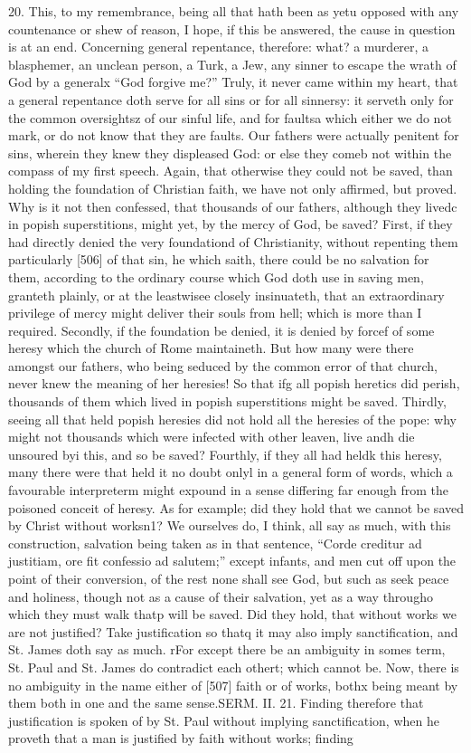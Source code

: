20. This, to my remembrance, being all that hath been as yetu opposed with any countenance or shew of reason, I hope, if this be answered, the cause in question is at an end. Concerning general repentance, therefore: what? a murderer, a blasphemer, an unclean person, a Turk, a Jew, any sinner to escape the wrath of God by a generalx “God forgive me?” Truly, it never came within my heart, that a general repentance doth serve for all sins or for all sinnersy: it serveth only for the common oversightsz of our sinful life, and for faultsa which either we do not mark, or do not know that they are faults. Our fathers were actually penitent for sins, wherein they knew they displeased God: or else they comeb not within the compass of my first speech. Again, that otherwise they could not be saved, than holding the foundation of Christian faith, we have not only affirmed, but proved. Why is it not then confessed, that thousands of our fathers, although they livedc in popish superstitions, might yet, by the mercy of God, be saved? First, if they had directly denied the very foundationd of Christianity, without repenting them particularly [506] of that sin, he which saith, there could be no salvation for them, according to the ordinary course which God doth use in saving men, granteth plainly, or at the leastwisee closely insinuateth, that an extraordinary privilege of mercy might deliver their souls from hell; which is more than I required. Secondly, if the foundation be denied, it is denied by forcef of some heresy which the church of Rome maintaineth. But how many were there amongst our fathers, who being seduced by the common error of that church, never knew the meaning of her heresies! So that ifg all popish heretics did perish, thousands of them which lived in popish superstitions might be saved. Thirdly, seeing all that held popish heresies did not hold all the heresies of the pope: why might not thousands which were infected with other leaven, live andh die unsoured byi this, and so be saved? Fourthly, if they all had heldk this heresy, many there were that held it no doubt onlyl in a general form of words, which a favourable interpreterm might expound in a sense differing far enough from the poisoned conceit of heresy. As for example; did they hold that we cannot be saved by Christ without worksn1? We ourselves do, I think, all say as much, with this construction, salvation being taken as in that sentence, “Corde creditur ad justitiam, ore fit confessio ad salutem;” except infants, and men cut off upon the point of their conversion, of the rest none shall see God, but such as seek peace and holiness, though not as a cause of their salvation, yet as a way througho which they must walk thatp will be saved. Did they hold, that without works we are not justified? Take justification so thatq it may also imply sanctification, and St. James doth say as much. rFor except there be an ambiguity in somes term, St. Paul and St. James do contradict each othert; which cannot be. Now, there is no ambiguity in the name either of [507] faith or of works, bothx being meant by them both in one and the same sense.SERM. II. 21. Finding therefore that justification is spoken of by St. Paul without implying sanctification, when he proveth that a man is justified by faith without works; finding 